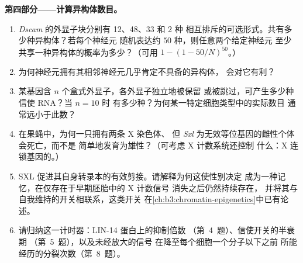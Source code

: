 \begin{problem}
\medskip
\noindent\textbf{第四部分——计算异构体数目。}
\begin{enumerate}[resume]
  \item \emph{Dscam} 的外显子块分别有 12、48、33 和 2 种
        相互排斥的可选形式。共有多少种异构体？若每个神经元
        随机表达约 $50$ 种，则任意两个给定神经元
        至少共享一种异构体的概率为多少？（可用 $1 - (1 -
        50/N)^{50}$。）
  \item 为何神经元拥有其相邻神经元几乎肯定不具备的异构体，
        会对它有利？
  \item 某基因含 $n$ 个盒式外显子，各外显子独立地被保留
        或被跳过，可产生多少种信使 RNA？当 $n = 10$ 时
        有多少种？为何某一特定细胞类型中的实际数目
        通常远小于此数？
  \item 在果蝇中，为何一只拥有两条 X 染色体、
        但 \emph{Sxl} 为无效等位基因的雌性个体会死亡，而不是
        简单地发育为雄性？（可考虑 X 计数系统还控制
        什么：X 连锁基因的。）
  \item SXL 促进其自身转录本的有效剪接。请解释为何这使性别决定
        成为一种记忆，在仅存在于早期胚胎中的 X 计数信号
        消失之后仍然持续存在，
        并将其与自我维持的开关相联系，这类开关
        在\cref{ch:b3:chromatin-epigenetics}中已有论述。
  \item 请归纳这一计时器：LIN-14 蛋白上的抑制倍数
        （第~4~题）、信使开关的半衰期
        （第~5~题），以及未经放大的信号
        在降至每个细胞一个分子以下之前
        所能经历的分裂次数（第~8~题）。
\end{enumerate}
\end{problem}
